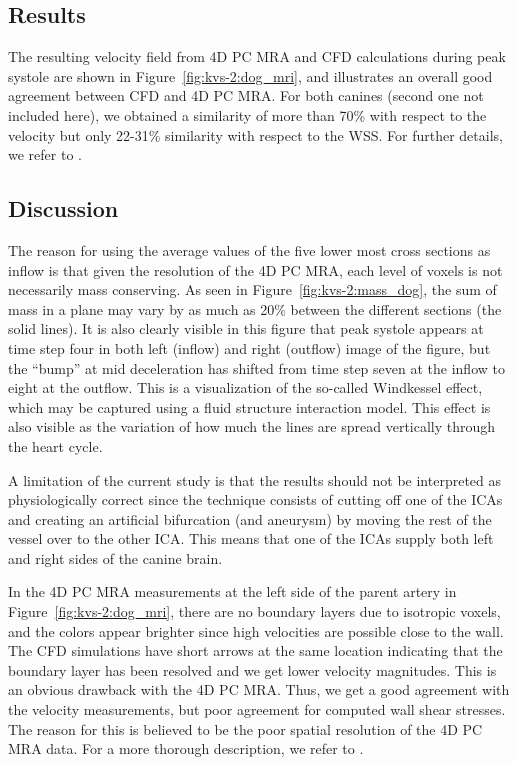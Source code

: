 \subsection{Results}

The resulting velocity field from 4D PC MRA and CFD calculations
during peak systole are shown in Figure~\ref{fig:kvs-2:dog_mri}, and
illustrates an overall good agreement between CFD and 4D PC MRA. For
both canines (second one not included here), we obtained a similarity
of more than 70\% with respect to the velocity but only 22-31\%
similarity with respect to the WSS. For further details, we refer
to \citet{JiangJohnsonValen-SendstadEtAl2010}.

\subsection{Discussion}

The reason for using the average values of the five lower most cross
sections as inflow is that given the resolution of the 4D PC MRA, each
level of voxels is not necessarily mass conserving. As seen in
Figure~\ref{fig:kvs-2:mass_dog}, the sum of mass in a plane may vary by as
much as 20\% between the different sections (the solid lines).  It is also clearly
visible in this figure that peak systole appears at time step four in
both left (inflow) and right (outflow) image of the figure, but the
``bump'' at mid deceleration has shifted from time step seven at the
inflow to eight at the outflow.  This is a visualization of the
so-called Windkessel effect, which may be captured using a fluid
structure interaction model. This effect is also visible as the
variation of how much the lines are spread vertically through the
heart cycle.

A limitation of the current study is that the results should not be
interpreted as physiologically correct since the technique consists of
cutting off one of the ICAs and creating an artificial bifurcation
(and aneurysm) by moving the rest of the vessel over to the other
ICA. This means that one of the ICAs supply both left and right sides
of the canine brain.

In the 4D PC MRA measurements at the left side of the parent artery in
Figure~\ref{fig:kvs-2:dog_mri}, there are no boundary layers due to
isotropic voxels, and the colors appear brighter since high velocities
are possible close to the wall.  The CFD simulations have short arrows
at the same location indicating that the boundary layer has been
resolved and we get lower velocity magnitudes.
This is an obvious drawback with
the 4D PC MRA. Thus, we get a good agreement with the velocity
measurements, but poor agreement for computed wall shear stresses. The
reason for this is believed to be the poor spatial resolution of the
4D PC MRA data. For a more thorough description, we refer
to \citet{JiangJohnsonValen-SendstadEtAl2010}.

